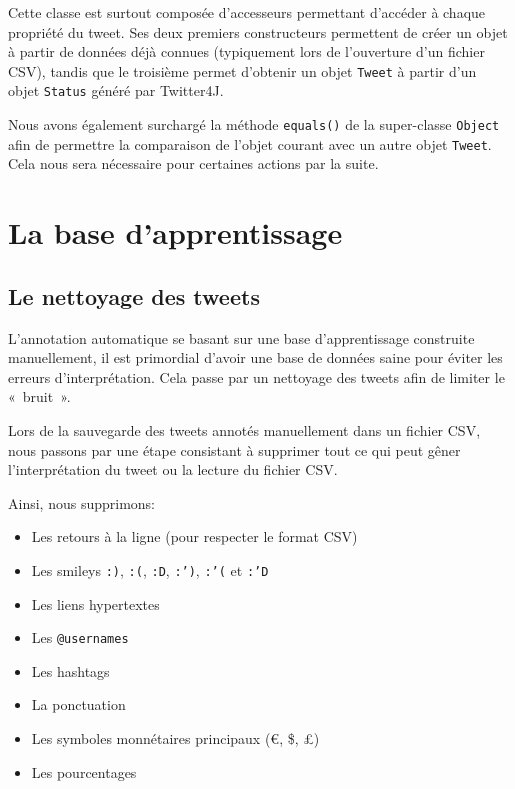 \documentclass[12pt,a4paper]{report}
\begin{document}
Cette classe est surtout composée d'accesseurs permettant d'accéder à chaque
propriété du tweet. Ses deux premiers constructeurs permettent de créer un objet
à partir de données déjà connues (typiquement lors de l'ouverture d'un fichier
CSV), tandis que le troisième permet d'obtenir un objet \texttt{Tweet} à partir
d'un objet \texttt{Status} généré par Twitter4J.

Nous avons également surchargé la méthode \texttt{equals()} de la super-classe
\texttt{Object} afin de permettre la comparaison de l'objet courant avec un
autre objet \texttt{Tweet}. Cela nous sera nécessaire pour certaines actions par
la suite.

\chapter{La base d'apprentissage}

\section{Le nettoyage des tweets}

L'annotation automatique se basant sur une base d'apprentissage construite
manuellement, il est primordial d'avoir une base de données saine pour éviter
les erreurs d'interprétation. Cela passe par un nettoyage des tweets afin de
limiter le «~bruit~».

Lors de la sauvegarde des tweets annotés manuellement dans un fichier CSV, nous
passons par une étape consistant à supprimer tout ce qui peut gêner
l'interprétation du tweet ou la lecture du fichier CSV.

Ainsi, nous supprimons:

\begin{itemize}
	\item
		Les retours à la ligne (pour respecter le format CSV)
	\item
		Les smileys \texttt{:)}, \texttt{:(}, \texttt{:D}, \texttt{:')},
		\texttt{:'(} et \texttt{:'D}
	\item
		Les liens hypertextes
	\item
		Les \texttt{@usernames}
	\item
		Les hashtags
	\item
		La ponctuation
	\item
		Les symboles monnétaires principaux (\euro, \$, £)
	\item
		Les pourcentages
\end{itemize}
\end{document}
